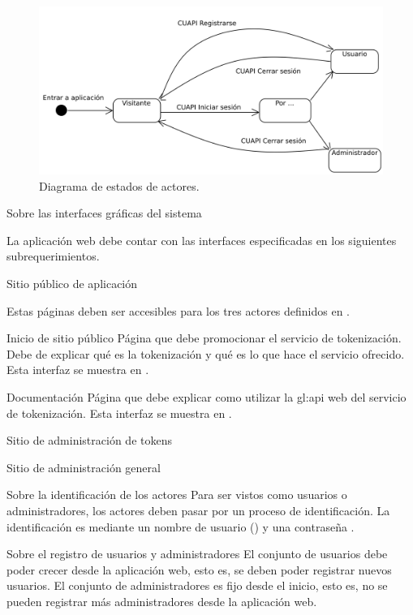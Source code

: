 
\begin{figure}
  \begin{center}
    \includegraphics[width=0.8\linewidth]{diagramas/flujo_de_actores.png}
    \caption{Diagrama de estados de actores.}
    \label{estados_actores}
  \end{center}
\end{figure}

{Sobre las interfaces gráficas del sistema}
{
  La aplicación web debe contar con las interfaces especificadas en los
  siguientes subrequerimientos.

  {Sitio público de aplicación}
  {
    Estas páginas deben ser accesibles para los tres actores definidos en
    .

    {Inicio de sitio público}
    {
      Página que debe promocionar el servicio de tokenización. Debe de explicar
      qué es la tokenización y qué es lo que hace el servicio ofrecido. Esta
      interfaz se muestra en .
    }

    {Documentación}
    {
      Página que debe explicar como utilizar la \gls{gl:api} web del
      servicio de tokenización. Esta interfaz se muestra en
      .
    }
  }

  {Sitio de administración de tokens}
  {

  }

  {Sitio de administración general}
  {

  }
}

{Sobre la identificación de los actores}
{
  Para ser vistos como usuarios o administradores, los actores deben
  pasar por un proceso de identificación. La identificación es mediante
  un nombre de usuario () y una
  contraseña {}.
}

{Sobre el registro de usuarios y administradores}
{
  El conjunto de usuarios debe poder crecer desde la aplicación web, esto es,
  se deben poder registrar nuevos usuarios. El conjunto de administradores es
  fijo desde el inicio, esto es, no se pueden registrar más administradores
  desde la aplicación web.
}

